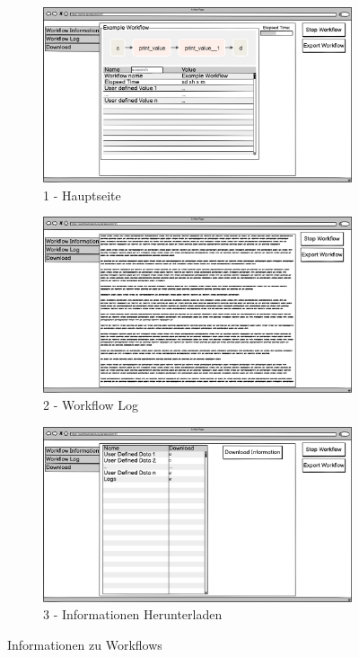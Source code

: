 \begin{figure}[ht]
    \begin{subfigure}{.75\textwidth}
        \centering
        \includegraphics[width = \textwidth]{Grafiken/Gui Mockups/workflowGui-InformationMain.png}
        \caption{1 - Hauptseite}
        \label{fig:sfig3}
    \end{subfigure}
    \begin{subfigure}{.75\textwidth}
        \centering
        \includegraphics[width = \textwidth]{Grafiken/Gui Mockups/workflowGui-InformationLog.png}
        \caption{2 - Workflow Log}
        \label{fig:sfig4}
    \end{subfigure}
    \begin{subfigure}{.75\textwidth}
        \centering
        \includegraphics[width = \textwidth]{Grafiken/Gui Mockups/workflowGui-InformationDownload.png}
        \caption{3 - Informationen Herunterladen}
        \label{fig:sfig5}
    \end{subfigure}
    \centering
    \caption{Informationen zu Workflows}
    \label{fig:Abb 6}
\end{figure}

